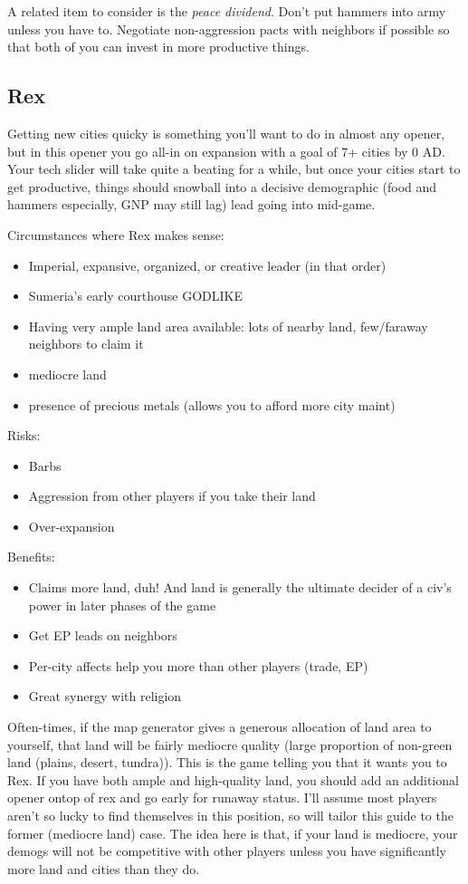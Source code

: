 \documentclass[10pt]{article}
\begin{document}
A related item to consider is the \emph{peace dividend}. Don't put hammers
into army unless you have to. Negotiate non-aggression pacts with
neighbors if possible so that both of you can invest in more
productive things.

\subsection*{Rex}

Getting new cities quicky is something you'll want to do in almost any
opener, but in this opener you go all-in on expansion with a goal of
7+ cities by 0 AD. Your tech slider will take quite a beating for a
while, but once your cities start to get productive, things should
snowball into a decisive demographic (food and hammers especially, GNP
may still lag) lead going into mid-game.

Circumstances where Rex makes sense:
\begin{itemize}
\item Imperial, expansive, organized, or creative leader (in that order)
\item Sumeria's early courthouse GODLIKE
\item Having very ample land area available: lots of nearby land, few/faraway neighbors to claim it
\item mediocre land
\item presence of precious metals (allows you to afford more city maint)
\end{itemize}

Risks:
\begin{itemize}
\item Barbs
\item Aggression from other players if you take their land
\item Over-expansion
\end{itemize}

Benefits:
\begin{itemize}
\item Claims more land, duh! And land is generally the ultimate decider of a civ's power in later phases of the game
\item Get EP leads on neighbors
\item Per-city affects help you more than other players (trade, EP)
\item Great synergy with religion
\end{itemize}

Often-times, if the map generator gives a generous allocation of land
area to yourself, that land will be fairly mediocre quality (large
proportion of non-green land (plains, desert, tundra)).  This is the
game telling you that it wants you to Rex. If you have both ample and
high-quality land, you should add an additional opener ontop of rex
and go early for runaway status. I'll assume most players aren't so
lucky to find themselves in this position, so will tailor this guide
to the former (mediocre land) case.  The idea here is that, if your
land is mediocre, your demogs will not be competitive with other
players unless you have significantly more land and cities than they
do.
\end{document}
